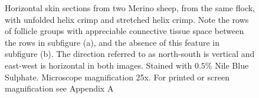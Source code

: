\documentclass{article}
\begin{document}
\begin{figure}
\begin{turn}{90}
\begin{minipage}[c][\textwidth][c]{\textheight}
\caption{Horizontal skin sections from two Merino sheep, from the same flock, with unfolded helix crimp and stretched helix crimp. Note the  rows of follicle groups with appreciable connective tissue space between the rows in subfigure (a), and the absence of this feature in subfigure (b). The direction referred to as north-south is vertical and east-west is horizontal in both images. Stained with $0.5$\% Nile Blue Sulphate. Microscope magnification 25x. For printed or screen magnification see Appendix A }
\end{minipage}
\end{turn}
\end{figure}
\end{document}
